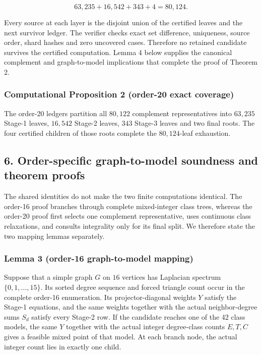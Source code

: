 \documentclass[
  english,
  11pt,
  a4paper,
]{article}
\begin{document}
\[
63{,}235+16{,}542+343+4=80{,}124.
\tag{5.12}
\]

Every source at each layer is the disjoint union of the certified leaves
and the next survivor ledger. The verifier checks exact set difference,
uniqueness, source order, shard hashes and zero uncovered cases.
Therefore no retained candidate survives the certified computation.
Lemma 4 below supplies the canonical complement and graph-to-model
implications that complete the proof of Theorem 2.

\subsubsection{Computational Proposition 2 (order-20 exact
coverage)}\label{computational-proposition-2-order-20-exact-coverage}

The order-20 ledgers partition all \(80{,}122\) complement
representatives into \(63{,}235\) Stage-1 leaves, \(16{,}542\) Stage-2
leaves, \(343\) Stage-3 leaves and two final roots. The four certified
children of those roots complete the \(80{,}124\)-leaf exhaustion.

\subsection{6. Order-specific graph-to-model soundness and theorem
proofs}\label{order-specific-graph-to-model-soundness-and-theorem-proofs}

The shared identities do not make the two finite computations identical.
The order-16 proof branches through complete mixed-integer class trees,
whereas the order-20 proof first selects one complement representative,
uses continuous class relaxations, and consults integrality only for its
final split. We therefore state the two mapping lemmas separately.

\subsubsection{Lemma 3 (order-16 graph-to-model
mapping)}\label{lemma-3-order-16-graph-to-model-mapping}

Suppose that a simple graph \(G\) on \(16\) vertices has Laplacian
spectrum \(\{0,1,\ldots,15\}\). Its sorted degree sequence and forced
triangle count occur in the complete order-16 enumeration. Its
projector-diagonal weights \(Y\) satisfy the Stage-1 equations, and the
same weights together with the actual neighbor-degree sums \(S_d\)
satisfy every Stage-2 row. If the candidate reaches one of the 42 class
models, the same \(Y\) together with the actual integer degree-class
counts \(E,T,C\) gives a feasible mixed point of that model. At each
branch node, the actual integer count lies in exactly one child.
\end{document}
